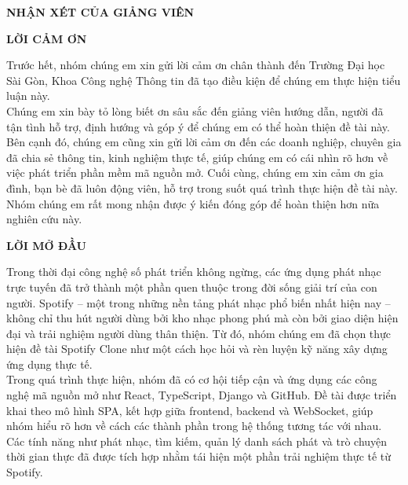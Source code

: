 \documentclass[a4paper]{article}
\begin{document}
\thispagestyle{empty}

\newpage

\begin{center}
    {\Large \textbf{NHẬN XÉT CỦA GIẢNG VIÊN}}
\end{center}

\newpage

\newpage
\begin{center}
    \textbf{{\Huge LỜI CẢM ƠN}}
\end{center}

Trước hết, nhóm chúng em xin gửi lời cảm ơn chân thành đến Trường Đại học Sài Gòn, Khoa Công nghệ Thông tin đã tạo điều kiện để chúng em thực hiện tiểu luận này.\\

Chúng em xin bày tỏ lòng biết ơn sâu sắc đến giảng viên hướng dẫn, người đã tận tình hỗ trợ, định hướng và góp ý để chúng em có thể hoàn thiện đề tài này.\\

Bên cạnh đó, chúng em cũng xin gửi lời cảm ơn đến các doanh nghiệp, chuyên gia đã chia sẻ thông tin, kinh nghiệm thực tế, giúp chúng em có cái nhìn rõ hơn về việc phát triển phần mềm mã nguồn mở. Cuối cùng, chúng em xin cảm ơn gia đình, bạn bè đã luôn động viên, hỗ trợ trong suốt quá trình thực hiện đề tài này.\\

Nhóm chúng em rất mong nhận được ý kiến đóng góp để hoàn thiện hơn nữa nghiên cứu này.

\newpage

\newpage
\begin{center}
    \textbf{{\Huge LỜI MỞ ĐẦU}}
\end{center}

Trong thời đại công nghệ số phát triển không ngừng, các ứng dụng phát nhạc trực tuyến đã trở thành một phần quen thuộc trong đời sống giải trí của con người. Spotify – một trong những nền tảng phát nhạc phổ biến nhất hiện nay – không chỉ thu hút người dùng bởi kho nhạc phong phú mà còn bởi giao diện hiện đại và trải nghiệm người dùng thân thiện. Từ đó, nhóm chúng em đã chọn thực hiện đề tài Spotify Clone như một cách học hỏi và rèn luyện kỹ năng xây dựng ứng dụng thực tế.\\

Trong quá trình thực hiện, nhóm đã có cơ hội tiếp cận và ứng dụng các công nghệ mã nguồn mở như React, TypeScript, Django và GitHub. Đề tài được triển khai theo mô hình SPA, kết hợp giữa frontend, backend và WebSocket, giúp nhóm hiểu rõ hơn về cách các thành phần trong hệ thống tương tác với nhau. Các tính năng như phát nhạc, tìm kiếm, quản lý danh sách phát và trò chuyện thời gian thực đã được tích hợp nhằm tái hiện một phần trải nghiệm thực tế từ Spotify.\\
\end{document}
